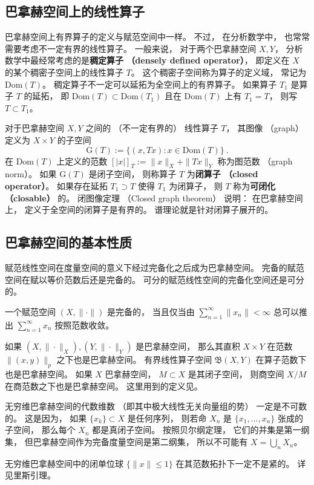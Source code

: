 \subsection{巴拿赫空间上的线性算子}
巴拿赫空间上有界算子的定义与赋范空间中一样。 不过， 在分析数学中， 也常常需要考虑不一定有界的线性算子。 一般来说， 对于两个巴拿赫空间 $X,Y$， 分析数学中最经常考虑的是\textbf{稠定算子 （densely defined operator）}， 即定义在 $X$ 的某个稠密子空间上的线性算子 $T$。 这个稠密子空间称为算子的定义域， 常记为 $\text{Dom}(T)$。 稠定算子不一定可以延拓为全空间上的有界算子。 如果算子 $T_1$ 是算子 $T$ 的延拓， 即 $\text{Dom}(T)\subset \text{Dom}(T_1)$ 且在 $\text{Dom}(T)$ 上有 $T_1=T$， 则写 $T\subset T_1$。

对于巴拿赫空间 $X,Y$ 之间的 （不一定有界的） 线性算子 $T$， 其图像 （graph） 定义为 $X\times Y$ 的子空间
$$
\text{G}(T):=\{(x,Tx):x\in \text{Dom}(T)\}~.
$$
在 $\text{Dom}(T)$ 上定义的范数 $[|x|]_T:=\|x\|_X+\|Tx\|_Y$ 称为图范数 （graph norm）。 如果 $\text{G}(T)$ 是闭子空间， 则称算子 $T$ 为\textbf{闭算子 （closed operator）}。 如果存在延拓 $T_1\supset T$ 使得 $T_1$ 为闭算子， 则 $T$ 称为\textbf{可闭化 （closable）} 的。 闭图像定理 （Closed graph theorem） 说明： 在巴拿赫空间上， 定义于全空间的闭算子是有界的。 谱理论就是针对闭算子展开的。

\subsection{巴拿赫空间的基本性质}
赋范线性空间在度量空间的意义下经过完备化之后成为巴拿赫空间。 完备的赋范空间在赋以等价范数后还是完备的。 可分的赋范线性空间的完备化空间还是可分的。 

一个赋范空间 $(X,\|\cdot\|)$ 是完备的， 当且仅当由 $\sum _{n=1}^{\infty }\|x_{n}\|<\infty $ 总可以推出 $\sum _{n=1}^{\infty }x_{n}$ 按照范数收敛。

如果 $(X,\|\cdot\|_X),(Y,\|\cdot\|_Y)$ 是巴拿赫空间， 那么其直积 $X\times Y$ 在范数 $\|(x,y)\|_{p}$ 之下也是巴拿赫空间。 有界线性算子空间 $\mathfrak{B}(X,Y)$ 在算子范数下也是巴拿赫空间。 如果 $X$ 巴拿赫空间， $M\subset X$ 是其闭子空间， 则商空间 $X/M$ 在商范数之下也是巴拿赫空间。 这里用到的定义见。

无穷维巴拿赫空间的代数维数 （即其中极大线性无关向量组的势） 一定是不可数的。 这是因为， 如果 $\{x_k\}\subset X$ 是任何序列， 则若命 $X_n$ 是 $\{x_1,...,x_n\}$ 张成的子空间， 那么每个 $X_n$ 都是真闭子空间。 按照贝尔纲定理， 它们的并集是第一纲集， 但巴拿赫空间作为完备度量空间是第二纲集， 所以不可能有 $X=\bigcup_n X_n$。

无穷维巴拿赫空间中的闭单位球 $\{\|x\|\leq1\}$ 在其范数拓扑下一定不是紧的。 详见里斯引理。

